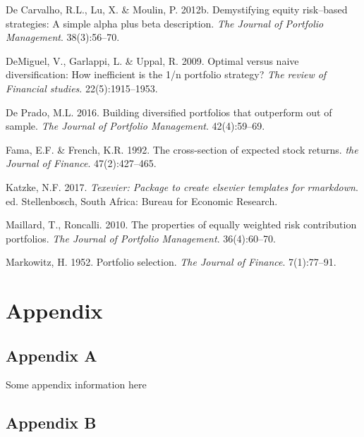 \documentclass[11pt,preprint, authoryear]{elsarticle}
\numberwithin{equation}{section}
\numberwithin{figure}{section}
\numberwithin{table}{section}
\begin{document}
\leavevmode\hypertarget{ref-leote}{}%
De Carvalho, R.L., Lu, X. \& Moulin, P. 2012b. Demystifying equity
risk--based strategies: A simple alpha plus beta description. \emph{The
Journal of Portfolio Management}. 38(3):56--70.

\leavevmode\hypertarget{ref-demiguel2009}{}%
DeMiguel, V., Garlappi, L. \& Uppal, R. 2009. Optimal versus naive
diversification: How inefficient is the 1/n portfolio strategy?
\emph{The review of Financial studies}. 22(5):1915--1953.

\leavevmode\hypertarget{ref-lopez}{}%
De Prado, M.L. 2016. Building diversified portfolios that outperform out
of sample. \emph{The Journal of Portfolio Management}. 42(4):59--69.

\leavevmode\hypertarget{ref-fama1992}{}%
Fama, E.F. \& French, K.R. 1992. The cross-section of expected stock
returns. \emph{the Journal of Finance}. 47(2):427--465.

\leavevmode\hypertarget{ref-Texevier}{}%
Katzke, N.F. 2017. \emph{Texevier: Package to create elsevier templates
for rmarkdown}. ed. Stellenbosch, South Africa: Bureau for Economic
Research.

\leavevmode\hypertarget{ref-maillard2010}{}%
Maillard, T., Roncalli. 2010. The properties of equally weighted risk
contribution portfolios. \emph{The Journal of Portfolio Management}.
36(4):60--70.

\leavevmode\hypertarget{ref-markowitz}{}%
Markowitz, H. 1952. Portfolio selection. \emph{The Journal of Finance}.
7(1):77--91.

\newpage

\hypertarget{appendix}{%
\section*{Appendix}\label{appendix}}

\hypertarget{appendix-a}{%
\subsection*{Appendix A}\label{appendix-a}}

Some appendix information here

\hypertarget{appendix-b}{%
\subsection*{Appendix B}\label{appendix-b}}


\end{document}
